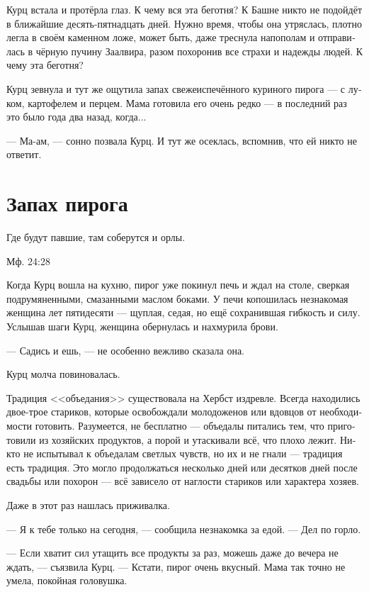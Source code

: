 \documentclass[a4paper,10pt,fleqn]{book}\usepackage{polyglossia}\setdefaultlanguage[babelshorthands=true]{russian}\setotherlanguage{english}\defaultfontfeatures{Ligatures=TeX,Mapping=tex-text}\usepackage{xcolor}\newcommand{\ml}[3]{#2}
\begin{document}
Курц встала и протёрла глаз.
К чему вся эта беготня?
К Башне никто не подойдёт в ближайшие десять-пятнадцать дней.
Нужно время, чтобы она утряслась, плотно легла в своём каменном ложе, может быть, даже треснула напополам и отправилась в чёрную пучину Заалвира, разом похоронив все страхи и надежды людей.
К чему эта беготня?

Курц зевнула и тут же ощутила запах свежеиспечённого куриного пирога --- с луком, картофелем и перцем.
Мама готовила его очень редко --- в последний раз это было года два назад, когда...

--- Ма-ам, --- сонно позвала Курц.
И тут же осеклась, вспомнив, что ей никто не ответит.

\section{Запах пирога}

\epigraph
{
\ml{$0$}
{Где будут павшие, там соберутся и орлы.}
{Wherever the dead shall be, there the eagles shall gather.}
}{Мф. 24:28}

Когда Курц вошла на кухню, пирог уже покинул печь и ждал на столе, сверкая подрумяненными, смазанными маслом боками.
У печи копошилась незнакомая женщина лет пятидесяти --- щуплая, седая, но ещё сохранившая гибкость и силу.
Услышав шаги Курц, женщина обернулась и нахмурила брови.

--- Садись и ешь, --- не особенно вежливо сказала она.

Курц молча повиновалась.

Традиция <<объедания>> существовала на Хербст издревле.
Всегда находились двое-трое стариков, которые освобождали молодоженов или вдовцов от необходимости готовить.
Разумеется, не бесплатно --- объедалы питались тем, что приготовили из хозяйских продуктов, а порой и утаскивали всё, что плохо лежит.
Никто не испытывал к объедалам светлых чувств, но их и не гнали --- традиция есть традиция.
Это могло продолжаться несколько дней или десятков дней после свадьбы или похорон --- всё зависело от наглости стариков или характера хозяев.

Даже в этот раз нашлась приживалка.

--- Я к тебе только на сегодня, --- сообщила незнакомка за едой.
--- Дел по горло.

--- Если хватит сил утащить все продукты за раз, можешь даже до вечера не ждать, --- съязвила Курц.
--- Кстати, пирог очень вкусный.
Мама так точно не умела, покойная головушка.
\end{document}
